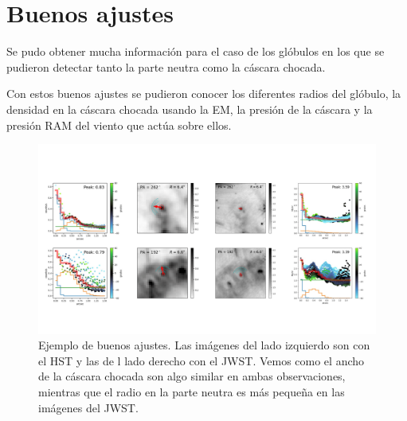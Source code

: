 \documentclass{book}
\begin{document}



\section{Buenos ajustes}\label{Good results}

Se pudo obtener mucha información para el caso de los glóbulos en los que se pudieron detectar tanto la parte neutra como la cáscara chocada. 

Con estos buenos ajustes se pudieron conocer los diferentes radios del glóbulo, la densidad en la cáscara chocada usando la EM, la presión de la cáscara y la presión RAM del viento que actúa sobre ellos.

\begin{figure}[h!]
    \centering
    \includegraphics[width=1.2\textwidth]{imagenes Chapter 4/ImgFi011-7.pdf}
    \caption{Ejemplo de buenos ajustes. Las imágenes del lado izquierdo son con el HST y las de l lado derecho con el JWST. Vemos como el ancho de la cáscara chocada son algo similar en ambas observaciones, mientras que el radio en la parte neutra es más pequeña en las imágenes del JWST.}
    \label{Goog G}
\end{figure}
\end{document}
